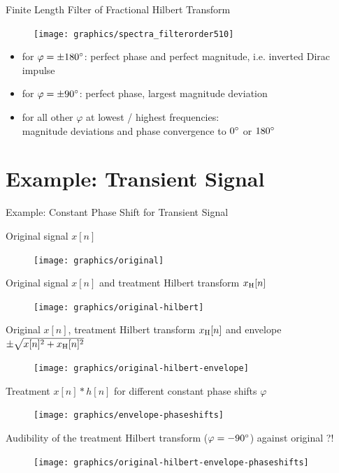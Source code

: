 \documentclass[mathserif]{intbeamer}
\begin{document}
%
%
%
\begin{frame}{Finite Length Filter of Fractional Hilbert Transform}
\begin{figure}
\texttt{[image: graphics/spectra\_filterorder510]}
\end{figure}

\begin{itemize}
\item for $\varphi=\pm 180\degree$: perfect phase and perfect magnitude, i.e. inverted Dirac impulse
\item for $\varphi=\pm 90\degree$: perfect phase, largest magnitude deviation
\item for all other $\varphi$ at lowest / highest frequencies:\\
magnitude deviations and phase convergence to $0\degree$ or $180\degree$
\end{itemize}
\end{frame}
%
%
%
\section{Example: Transient Signal}
\begin{frame}{Example: Constant Phase Shift for Transient Signal}
{
Original signal $x[n]$
\begin{figure}
\texttt{[image: graphics/original]}
\end{figure}
}
{
Original signal $x[n]$ and treatment Hilbert transform $x_{\mathrm{H}}[n]$
\begin{figure}
\texttt{[image: graphics/original-hilbert]}
\end{figure}
}
{
Original $x[n]$, treatment Hilbert transform $x_{\mathrm{H}}[n]$ and envelope
$\pm\sqrt{x[n]^2+x_{\mathrm{H}}[n]^2}$
\begin{figure}
\texttt{[image: graphics/original-hilbert-envelope]}
\end{figure}
}
{
Treatment $x[n]\ast h[n]$ for different constant phase shifts $\varphi$
\begin{figure}
\texttt{[image: graphics/envelope-phaseshifts]}
\end{figure}
}
{
Audibility of the treatment Hilbert transform ($\varphi=-90\degree$) against original ?!
\begin{figure}
\texttt{[image: graphics/original-hilbert-envelope-phaseshifts]}
\end{figure}
}
\end{frame}
%
%
%
\end{document}
